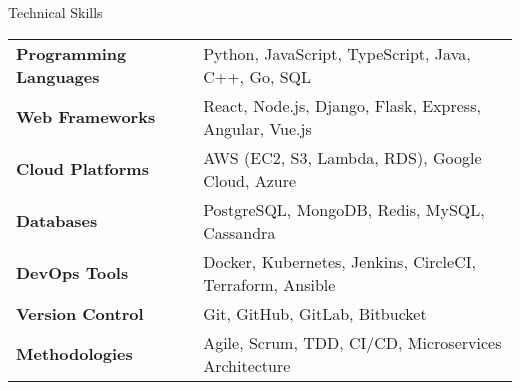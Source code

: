 \documentclass{resume} %
\begin{document}

\begin{rSection}{Technical Skills}

\begin{tabular}{ @{} >{\bfseries}l @{\hspace{6ex}} l }
Programming Languages & Python, JavaScript, TypeScript, Java, C++, Go, SQL \\
Web Frameworks & React, Node.js, Django, Flask, Express, Angular, Vue.js \\
Cloud Platforms & AWS (EC2, S3, Lambda, RDS), Google Cloud, Azure \\
Databases & PostgreSQL, MongoDB, Redis, MySQL, Cassandra \\
DevOps Tools & Docker, Kubernetes, Jenkins, CircleCI, Terraform, Ansible \\
Version Control & Git, GitHub, GitLab, Bitbucket \\
Methodologies & Agile, Scrum, TDD, CI/CD, Microservices Architecture \\
\end{tabular}

\end{rSection}

\end{document}
